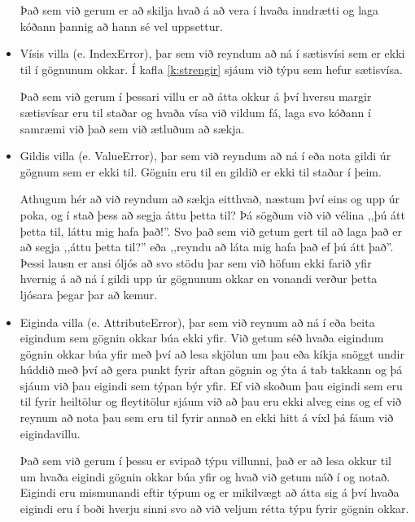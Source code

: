 \begin{itemize}
	Það sem við gerum er að skilja hvað á að vera í hvaða inndrætti og laga kóðann þannig að hann sé vel uppsettur.
	
	\item Vísis villa (e. IndexError), þar sem við reyndum að ná í sætisvísi sem er ekki til í gögnunum okkar.
	Í kafla \ref{k:strengir} sjáum við týpu sem hefur sætisvísa.
	
	Það sem við gerum í þessari villu er að átta okkur á því hversu margir sætisvísar eru til staðar og hvaða vísa við vildum fá, laga svo kóðann í samræmi við það sem við ætluðum að sækja.
	
	\item Gildis villa (e. ValueError), þar sem við reyndum að ná í eða nota gildi úr gögnum sem er ekki til.
	Gögnin eru til en gildið er ekki til staðar í þeim.
	
	Athugum hér að við reyndum að sækja eitthvað, næstum því eins og upp úr poka, og í stað þess að segja áttu þetta til? Þá sögðum við við vélina ,,þú átt þetta til, láttu mig hafa það!''. Svo það sem við getum gert til að laga það er að segja ,,áttu þetta til?'' eða ,,reyndu að láta mig hafa það ef þú átt það''. 
	Þessi lausn er ansi óljós að svo stödu þar sem við höfum ekki farið yfir hvernig á að ná í gildi upp úr gögnunum okkar en vonandi verður þetta ljósara þegar þar að kemur.
	
	\item Eiginda villa (e. AttributeError), þar sem við reynum að ná í eða beita eigindum sem gögnin okkar búa ekki yfir.
	Við getum séð hvaða eigindum gögnin okkar búa yfir með því að lesa skjölun um þau eða kíkja snöggt undir húddið með því að gera punkt fyrir aftan gögnin og ýta á tab takkann  og þá sjáum við þau eigindi sem týpan býr yfir.
	Ef við skoðum þau eigindi sem eru til fyrir heiltölur og fleytitölur sjáum við að þau eru ekki alveg eins og ef við reynum að nota þau sem eru til fyrir annað en ekki hitt á víxl þá fáum við eigindavillu.
	
	Það sem við gerum í þessu er svipað týpu villunni, það er að lesa okkur til um hvaða eigindi gögnin okkar búa yfir og hvað við getum náð í og notað.
	Eigindi eru mismunandi eftir týpum og er mikilvægt að átta sig á því hvaða eigindi eru í boði hverju sinni svo að við veljum rétta týpu fyrir gögnin okkar.
\end{itemize}

